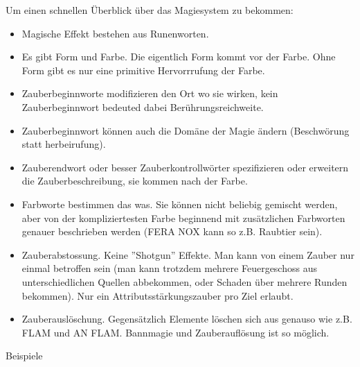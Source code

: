 \documentclass{article}
\begin{document}
Um einen schnellen Überblick über das Magiesystem zu bekommen:

\begin{itemize}
\item Magische Effekt bestehen aus Runenworten.
\item Es gibt Form und Farbe. Die eigentlich Form kommt vor der Farbe. Ohne Form gibt es nur eine primitive Hervorrrufung der Farbe.
\item Zauberbeginnworte modifizieren den Ort wo sie wirken, kein Zauberbeginnwort bedeuted dabei Berührungsreichweite.
\item Zauberbeginnwort können auch die Domäne der Magie ändern (Beschwörung statt herbeirufung).
\item Zauberendwort oder besser Zauberkontrollwörter spezifizieren oder erweitern die Zauberbeschreibung, sie kommen nach der Farbe.
\item Farbworte bestimmen das was. Sie können nicht beliebig gemischt werden, aber von der kompliziertesten Farbe beginnend mit zusätzlichen Farbworten genauer beschrieben werden (FERA NOX kann so z.B. Raubtier sein).
\item Zauberabstossung. Keine ''Shotgun'' Effekte. Man kann von einem Zauber nur einmal betroffen sein (man kann trotzdem mehrere Feuergeschoss aus unterschiedlichen Quellen abbekommen, oder Schaden über mehrere Runden bekommen). Nur ein Attributsstärkungszauber pro Ziel erlaubt.
\item Zauberauslöschung. Gegensätzlich Elemente löschen sich aus genauso wie z.B. FLAM und AN FLAM. Bannmagie und Zauberauflösung ist so möglich.
\end{itemize}

Beispiele
\end{document}

